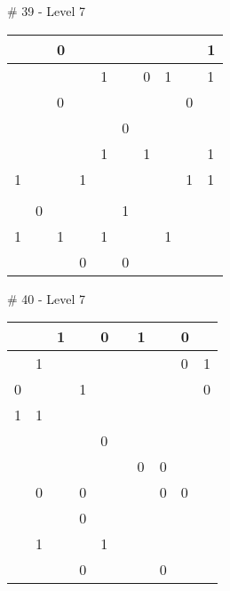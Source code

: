 \medskip

\# 39 - Level 7 \newline
\begin{tabular}{|m{\collen}|m{\collen}|m{\collen}|m{\collen}|m{\collen}|m{\collen}|m{\collen}|m{\collen}|m{\collen}|m{\collen}|}
\hline
    &   & 0 &   &   &   &   &   &   & 1 \\
\hline
    &   &   &   & 1 &   & 0 & 1 &   & 1 \\
\hline
    &   & 0 &   &   &   &   &   & 0 &   \\
\hline
    &   &   &   &   & 0 &   &   &   &   \\
\hline
    &   &   &   & 1 &   & 1 &   &   & 1 \\
\hline
  1 &   &   & 1 &   &   &   &   & 1 & 1 \\
\hline
    &   &   &   &   &   &   &   &   &   \\
\hline
    & 0 &   &   &   & 1 &   &   &   &   \\
\hline
  1 &   & 1 &   & 1 &   &   & 1 &   &   \\
\hline
    &   &   & 0 &   & 0 &   &   &   &   \\
\hline
\end{tabular}


\medskip

\# 40 - Level 7 \newline
\begin{tabular}{|m{\collen}|m{\collen}|m{\collen}|m{\collen}|m{\collen}|m{\collen}|m{\collen}|m{\collen}|m{\collen}|m{\collen}|}
\hline
    &   & 1 &   & 0 &   & 1 &   & 0 &   \\
\hline
    & 1 &   &   &   &   &   &   & 0 & 1 \\
\hline
  0 &   &   & 1 &   &   &   &   &   & 0 \\
\hline
  1 & 1 &   &   &   &   &   &   &   &   \\
\hline
    &   &   &   & 0 &   &   &   &   &   \\
\hline
    &   &   &   &   &   & 0 & 0 &   &   \\
\hline
    & 0 &   & 0 &   &   &   & 0 & 0 &   \\
\hline
    &   &   & 0 &   &   &   &   &   &   \\
\hline
    & 1 &   &   & 1 &   &   &   &   &   \\
\hline
    &   &   & 0 &   &   &   & 0 &   &   \\
\hline
\end{tabular}


\medskip

